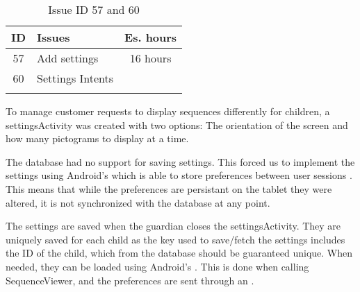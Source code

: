 \begin{longtable} { | c | p{12cm} | c | } 
\hline
	ID 	&	Issues	&		 Es. hours \\\hline
	57	&	Add settings	&	16 hours	\\\hline
	60	&	Settings Intents & \\\hline
\caption{Issue ID 57 and 60}
\label{tab:spr4_addsettings}
\end{longtable}

To manage customer requests to display sequences differently for children, a settingsActivity was created with two options: The orientation of the screen and how many pictograms to display at a time.

The database had no support for saving settings. This forced us to implement the settings using Android's  which is able to store preferences between user sessions \cite{sharedpreferences}. This means that while the preferences are persistant on the tablet they were altered, it is not synchronized with the database at any point.

The settings are saved when the guardian closes the settingsActivity. They are uniquely saved for each child as the key used to save/fetch the settings includes the ID of the child, which from the database should be guaranteed unique. When needed, they can be loaded using Android's . This is done when calling SequenceViewer, and the preferences are sent through an .
